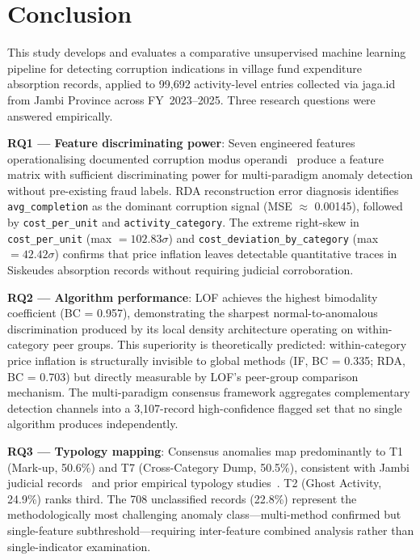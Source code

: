 \documentclass[3p,times,procedia]{elsarticle}
\begin{document}
\section{Conclusion}
\label{sec:conclusion}

This study develops and evaluates a comparative unsupervised machine learning pipeline for detecting corruption indications in village fund expenditure absorption records, applied to 99,692 activity-level entries collected via jaga.id from Jambi Province across FY~2023--2025. Three research questions were answered empirically.

\textbf{RQ1 --- Feature discriminating power}: Seven engineered features operationalising documented corruption modus operandi~\cite{ref13,ref14} produce a feature matrix with sufficient discriminating power for multi-paradigm anomaly detection without pre-existing fraud labels. RDA reconstruction error diagnosis identifies \texttt{avg\_completion} as the dominant corruption signal (MSE $\approx$ 0.00145), followed by \texttt{cost\_per\_unit} and \texttt{activity\_category}. The extreme right-skew in \texttt{cost\_per\_unit} (max $= 102.83\sigma$) and \texttt{cost\_deviation\_by\_category} (max $= 42.42\sigma$) confirms that price inflation leaves detectable quantitative traces in Siskeudes absorption records without requiring judicial corroboration.

\textbf{RQ2 --- Algorithm performance}: LOF achieves the highest bimodality coefficient (BC = 0.957), demonstrating the sharpest normal-to-anomalous discrimination produced by its local density architecture operating on within-category peer groups. This superiority is theoretically predicted: within-category price inflation is structurally invisible to global methods (IF, BC = 0.335; RDA, BC = 0.703) but directly measurable by LOF's peer-group comparison mechanism. The multi-paradigm consensus framework aggregates complementary detection channels into a 3,107-record high-confidence flagged set that no single algorithm produces independently.

\textbf{RQ3 --- Typology mapping}: Consensus anomalies map predominantly to T1 (Mark-up, 50.6\%) and T7 (Cross-Category Dump, 50.5\%), consistent with Jambi judicial records~\cite{ref15,ref16,ref17,ref18} and prior empirical typology studies~\cite{ref13,ref14}. T2 (Ghost Activity, 24.9\%) ranks third. The 708 unclassified records (22.8\%) represent the methodologically most challenging anomaly class---multi-method confirmed but single-feature subthreshold---requiring inter-feature combined analysis rather than single-indicator examination.
\end{document}
